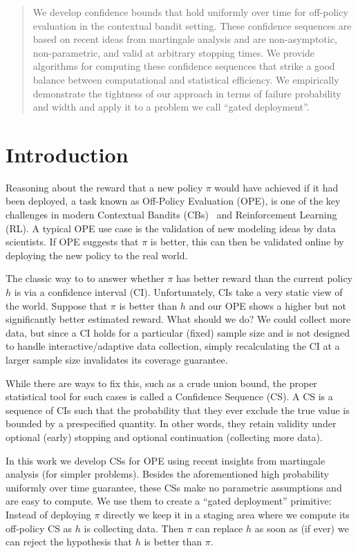 \begin{abstract}
	We develop confidence bounds that hold uniformly over time for off-policy
	evaluation in the contextual bandit setting. These confidence sequences
	are based on recent ideas from martingale analysis and are
	non-asymptotic, non-parametric, and valid at arbitrary stopping times.
	We provide algorithms for computing these confidence sequences that
	strike a good balance between computational and statistical efficiency.
	We empirically demonstrate the tightness of our approach in terms of
	failure probability and width and apply it to a problem we call 
	``gated deployment''.
\end{abstract}

\section{Introduction} 
Reasoning about the reward that a new policy $\pi$ would have achieved if it
had been deployed, a task known as Off-Policy Evaluation (OPE), is one of the
key challenges in modern Contextual Bandits (CBs)~\cite{epochgreedy} and Reinforcement Learning (RL).  A typical OPE use case is the validation of new modeling ideas
by data scientists. If OPE suggests that $\pi$ is better, this can then be
validated online by deploying the new policy to the real world.

The classic way to to answer whether $\pi$ has better reward than the current
policy $h$ is via a confidence interval (CI).  Unfortunately, CIs take a very
static view of the world.  Suppose that $\pi$ is better than $h$ and our OPE
shows a higher but not significantly better estimated reward. What should we
do? We could collect more data, but since a CI holds for a particular (fixed) sample size and is not designed to handle interactive/adaptive data collection, simply recalculating the CI at a larger sample size invalidates its coverage
guarantee. 

While there are ways to fix this, such as a crude union bound, the proper statistical tool for such cases is called a Confidence Sequence (CS). A CS is a
sequence of CIs such that the probability that they ever exclude the true value
is bounded by a prespecified quantity.  In other words, they retain validity under optional (early)
stopping and optional continuation (collecting more data).

In this work we develop CSs for OPE using recent insights from martingale
analysis (for simpler problems).  Besides the aforementioned high probability uniformly over time
guarantee, these CSs make no parametric assumptions and are easy to compute.
We use them to create a ``gated deployment'' primitive: Instead of deploying
$\pi$ directly we keep it in a staging area where we compute its off-policy CS
as $h$ is collecting data.  Then $\pi$ can replace $h$ as soon as (if ever) we
can reject the hypothesis that $h$ is better than $\pi$.

